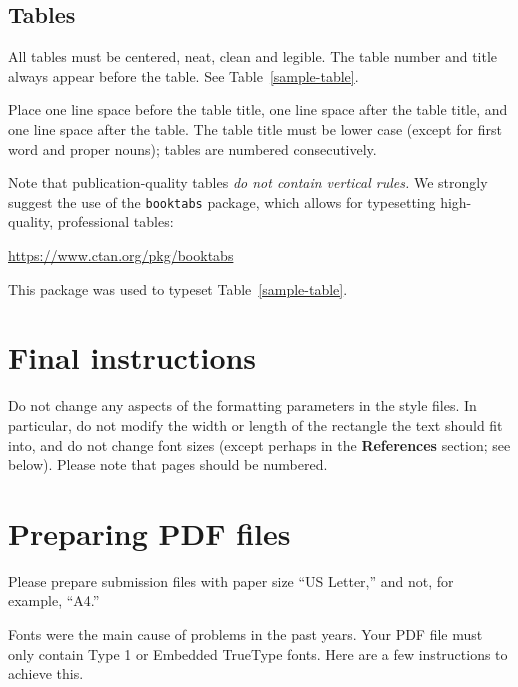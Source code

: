 \documentclass{article}
\begin{document}
\subsection{Tables}

All tables must be centered, neat, clean and legible.  The table
number and title always appear before the table.  See
Table~\ref{sample-table}.

Place one line space before the table title, one line space after the
table title, and one line space after the table. The table title must
be lower case (except for first word and proper nouns); tables are
numbered consecutively.

Note that publication-quality tables \emph{do not contain vertical
  rules.} We strongly suggest the use of the \verb+booktabs+ package,
which allows for typesetting high-quality, professional tables:
\begin{center}
  \url{https://www.ctan.org/pkg/booktabs}
\end{center}
This package was used to typeset Table~\ref{sample-table}.

\section{Final instructions}

Do not change any aspects of the formatting parameters in the style
files.  In particular, do not modify the width or length of the
rectangle the text should fit into, and do not change font sizes
(except perhaps in the \textbf{References} section; see below). Please
note that pages should be numbered.

\section{Preparing PDF files}

Please prepare submission files with paper size ``US Letter,'' and
not, for example, ``A4.''

Fonts were the main cause of problems in the past years. Your PDF file
must only contain Type 1 or Embedded TrueType fonts. Here are a few
instructions to achieve this.
\end{document}
